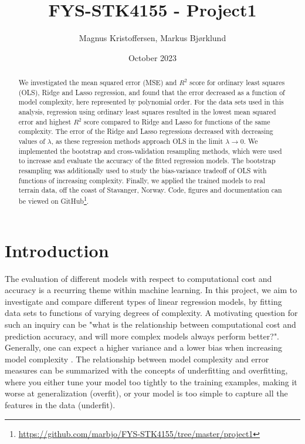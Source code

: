 \documentclass[12pt]{article}
\title{FYS-STK4155 - Project1}
\author{Magnus Kristoffersen, Markus Bjørklund}
\date{October 2023}
\begin{document}
\maketitle

\begin{abstract}
    We investigated the mean squared error (MSE) and $R^2$ score for ordinary least squares (OLS), Ridge and Lasso regression, and found that the error decreased as a function of model complexity, here represented by polynomial order. For the data sets used in this analysis, regression using ordinary least squares resulted in the lowest mean squared error and highest $R^2$ score compared to Ridge and Lasso for functions of the same complexity. The error of the Ridge and Lasso regressions decreased with decreasing values of $\lambda$, as these regression methods approach OLS in the limit $\lambda \rightarrow 0$. We implemented the bootstrap and cross-validation resampling methods, which were used to increase and evaluate the accuracy of the fitted regression models. The bootstrap resampling was additionally used to study the bias-variance tradeoff of OLS with functions of increasing complexity. Finally, we applied the trained models to real terrain data, off the coast of Stavanger, Norway. Code, figures and documentation can be viewed on GitHub\footnote{\url{https://github.com/marbjo/FYS-STK4155/tree/master/project1}}.
\end{abstract}

\section{Introduction}
The evaluation of different models with respect to computational cost and accuracy is a recurring theme within machine learning. In this project, we aim to investigate and compare different types of linear regression models, 
by fitting data sets to functions of varying degrees of complexity. A motivating question for such an inquiry can be "what is the relationship between computational cost and prediction accuracy, and will more complex models always perform better?". Generally, one can expect a higher variance and a lower bias when increasing model complexity \cite{Hastie2009}. The relationship between model complexity and error measures can be summarized with the concepts of underfitting and overfitting, where you either tune your model too tightly to the training examples, making it worse at generalization (overfit), or your model is too simple to capture all the features in the data (underfit).
\end{document}
